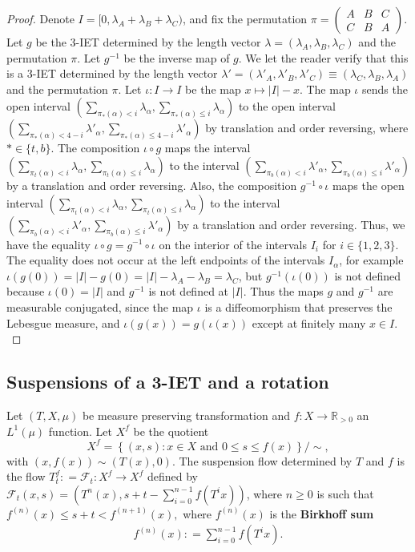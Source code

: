 \documentclass[oneside]{amsart}
\theoremstyle{plain}
\theoremstyle{definition}
\newcommand{\dfn}{\mathrel{\mathop:}=}
\newcommand{\<}{\langle}
\renewcommand{\>}{\rangle}
\newcommand{\C}{\mathbb{C}}
\newcommand{\R}{\mathbb{R}}
\newcommand{\Flow}{\mathcal{F}}
\renewcommand{\|}{|\!|} %
\begin{document}
\begin{proof}[Proof]
    Denote $I = [0,\lambda_A+\lambda_B+\lambda_C)$, and fix the permutation $\pi=\begin{pmatrix}
        A&B&C\\C&B&A
    \end{pmatrix}$. Let $g$ be the 3-IET determined by the length vector $\lambda=(\lambda_A,\lambda_B,\lambda_C)$ and the permutation $\pi.$ Let $g^{-1}$ be the inverse map of $g$. We let the reader verify that this is a 3-IET determined by the length vector $\lambda'=(\lambda'_A,\lambda'_B,\lambda'_C)\equiv (\lambda_C,\lambda_B,\lambda_A)$ and the permutation $\pi.$ 
    Let $\iota:I\to I$ be the map $x\mapsto|I|-x.$ 
    The map $\iota$ sends the open interval $(\sum_{\pi_*(\alpha) < i}\lambda_\alpha,\sum_{\pi_*(\alpha) \le i}\lambda_\alpha)$ to the open interval $(\sum_{\pi_*(\alpha) < 4-i}\lambda'_\alpha,\sum_{\pi_*(\alpha) \le 4-i}\lambda'_\alpha)$ by translation and order reversing, where $* \in \{t,b\}$.
    The composition $\iota\circ g$ maps the interval $(\sum_{\pi_t(\alpha) < i}\lambda_\alpha,\sum_{\pi_t(\alpha) \le i}\lambda_\alpha)$ to the interval $(\sum_{\pi_b(\alpha) < i}\lambda'_\alpha,\sum_{\pi_b(\alpha) \le i}\lambda'_\alpha)$ by a translation and order reversing.
    Also, the composition $g^{-1}\circ \iota$ maps the open interval $(\sum_{\pi_t(\alpha) < i}\lambda_\alpha,\sum_{\pi_t(\alpha) \le i}\lambda_\alpha)$ to the interval $(\sum_{\pi_b(\alpha) < i}\lambda'_\alpha,\sum_{\pi_b(\alpha) \le i}\lambda'_\alpha)$ by a translation and order reversing.  Thus, we have the equality $\iota\circ g = g^{-1} \circ \iota$ on the interior of the intervals $I_i$ for $i \in \{1,2,3\}$. 
    The equality does not occur at the left endpoints of the intervals $I_\alpha$, for example $\iota(g(0))=|I|-g(0)=|I|-\lambda_A-\lambda_B=\lambda_C$, but $g^{-1}(\iota(0))$ is not defined because $\iota(0)=|I|$ and $g^{-1}$ is not defined at $|I|.$ Thus the maps $g$ and $g^{-1}$ are measurable conjugated, since the map $\iota$ is a diffeomorphism that preserves the Lebesgue measure, and $\iota(g(x)) = g(\iota(x))$ except at finitely many $x \in I.$
\end{proof}

\subsection{Suspensions of a 3-IET and a rotation}


Let $(T,X,\mu)$ be measure preserving transformation and $f \colon X \to \R_{>0}$ an $L^1(\mu)$ function. 
Let $X^f$ be the quotient
\begin{equation*}
    X^f=\left \{(x,s):x \in X \text{ and } 0 \le s \le f(x) \right \}/\sim, 
\end{equation*}
with $(x,f(x)) \sim (T(x),0).$
The suspension flow determined by $T$ and $f$ is the flow
$T^f_t \dfn \Flow_t\colon X^f \to X^f$ defined by $\Flow_t(x,s) = (T^n(x),s+t-\sum_{i=0}^{n-1}f(T^ix))$, where $n \ge 0$ is such that
$f^{(n)}(x)  \leq s+t < f^{(n+1)}(x),$ where $f^{(n)}(x) $ is the \textbf{Birkhoff sum} 
\begin{align*}
    f^{(n)}(x) \dfn \sum_{i=0}^{n-1}f(T^ix).
\end{align*}
\end{document}
